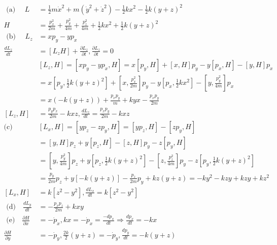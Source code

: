 \begin{enumerate}
\begin{answer}
\begin{align*}
	\text { (a) } \quad L&=\frac{1}{2} m \dot{x}^{2}+m\left(\dot{y}^{2}+\dot{z}^{2}\right)-\frac{1}{2} k x^{2}-\frac{1}{2} k(y+z)^{2}\\
	H&=\frac{p_{x}^{2}}{2 m}+\frac{p_{y}^{2}}{4 m}+\frac{p_{z}^{2}}{4 m}+\frac{1}{2} k x^{2}+\frac{1}{2} k(y+z)^{2}\\
	\text { (b) } \quad L_{z}&=x p_{y}-y p_{x}\\
	\frac{d L_{z}}{d t}&=\left[L_{z} H\right]+\frac{\partial L_{z}}{\partial t}, \frac{\partial L_{z}}{\partial t}=0\\
	&{\left[L_{z}, H\right]=\left[x p_{y}-y p_{x}, H\right]=x\left[p_{y}, H\right]+[x, H] p_{y}-y\left[p_{x}, H\right]-[y, H] p_{x}} \\
	&=x\left[p_{y}, \frac{1}{2} k(y+z)^{2}\right]+\left[x, \frac{p_{x}^{2}}{2 m}\right] p_{y}-y\left[p_{x}, \frac{1}{2} k x^{2}\right]-\left[y, \frac{p_{y}^{2}}{4 m}\right] p_{x} \\
	&=x(-k(y+z))+\frac{p_{x} p_{y}}{m}+k y x-\frac{p_{x} p_{y}}{2 m}\\
	\left[L_{z}, H\right]&=\frac{p_{y} p_{x}}{2 m}-k x z, \frac{d L_{z}}{d t}=\frac{p_{x} p_{y}}{2 m}-k x z\\
	\text{(c)}\quad &{\left[L_{x}, H\right]=\left[y p_{z}-z p_{y}, H\right]=\left[y p_{z}, H\right]-\left[z p_{y}, H\right]} \\
	&=[y, H] p_{z}+y\left[p_{z}, H\right]-[z, H] p_{y}-z\left[p_{y}, H\right] \\
	&=\left[y, \frac{p_{y}^{2}}{4 m}\right] p_{z}+y\left[p_{z}, \frac{1}{2} k(y+z)^{2}\right]-\left[z, \frac{p_{z}^{2}}{4 m}\right] p_{y}-z\left[p_{y}, \frac{1}{2} k(y+z)^{2}\right] \\
	&=\frac{p_{y}}{2 m} p_{z}+y[-k(y+z)]-\frac{p_{z}}{2 m} p_{y}+k z(y+z)=-k y^{2}-k z y+k z y+k z^{2}\\
	\left[L_{x}, H\right]&=k\left[z^{2}-y^{2}\right], \frac{d L_{x}}{d t}=k\left[z^{2}-y^{2}\right]\\
\text{	(d)}\quad 
	\frac{d L_{y}}{d t}&=-\frac{p_{x} p_{z}}{2 m}+k x y\\
\text{	(e)}\quad 
	\frac{\partial H}{\partial x}&=-\dot{p}_{x}, k x=-\dot{p}_{x}=\frac{-d p_{x}}{d t} \Rightarrow \frac{d p_{x}}{d t}=-k x\\
	\frac{\partial H}{\partial y}&=-\dot{p}_{y}, \frac{2 k}{2}(y+z)=-\dot{p}_{y}, \frac{d p_{y}}{d t}=-k(y+z)
	\end{align*}
\end{answer}
\end{enumerate}